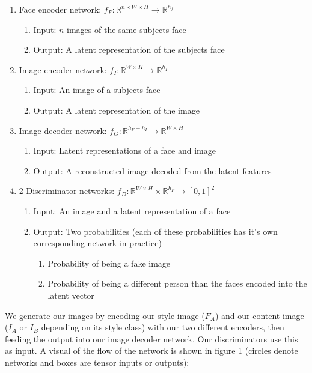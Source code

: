 \documentclass{article}
\begin{document}
\begin{enumerate}
	\item Face encoder network: $f_F: \mathbb{R}^{n\times W \times H} \rightarrow \mathbb{R}^{h_f}$
	      \begin{enumerate}
		      \item Input: $n$ images of the same subjects face
		      \item Output: A latent representation of the subjects face
	      \end{enumerate}
	\item Image encoder network: $f_I: \mathbb{R}^{W \times H} \rightarrow \mathbb{R}^{h_I}$
	      \begin{enumerate}
		      \item Input: An image of a subjects face
		      \item Output: A latent representation of the image
	      \end{enumerate}
	\item Image decoder network: $f_G: \mathbb{R}^{h_F + h_I} \rightarrow \mathbb{R}^{W \times H}$
	      \begin{enumerate}
		      \item Input: Latent representations of a face and image
		      \item Output: A reconstructed image decoded from the latent features
	      \end{enumerate}
	\item 2 Discriminator networks: $f_D: \mathbb{R}^{W \times H} \times \mathbb{R}^{h_F} \rightarrow [0,1]^2$
	      \begin{enumerate}
		      \item Input: An image and a latent representation of a face
		      \item Output: Two probabilities (each of these probabilities has it's own corresponding network in practice)
		            \begin{enumerate}
			            \item Probability of being a fake image
			            \item Probability of being a different person than the faces encoded into the latent vector
		            \end{enumerate}
	      \end{enumerate}
\end{enumerate}

We generate our images by encoding our style image ($F_A$)
and our content image ($I_A$ or $I_B$ depending on its style class)
with our two different encoders, then feeding the output into
our image decoder network. Our discriminators use this as input.
A visual of the flow of the network is shown in figure 1
(circles denote networks and boxes are tensor inputs or outputs):
\end{document}
